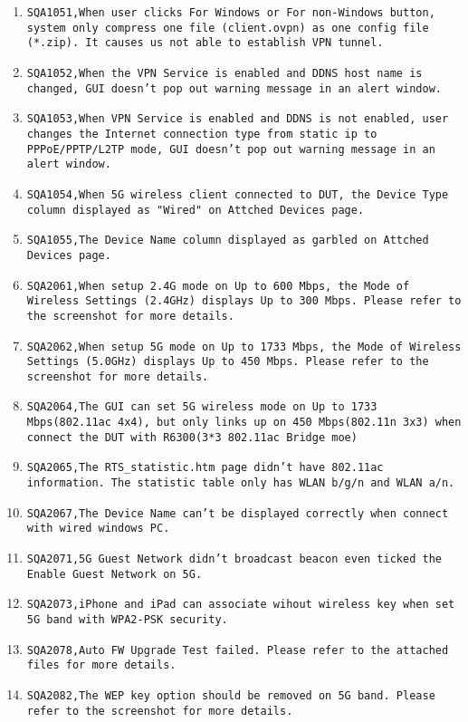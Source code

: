 \documentclass[12pt]{report}
\begin{document}
\begin{itemize}
\begin{enumerate}
		\item \texttt{SQA1051,When user clicks For Windows or For non-Windows button, system only compress one file (client.ovpn) as one config file (*.zip). It causes us not able to establish VPN tunnel.}
		\item \texttt{SQA1052,When the VPN Service is enabled and DDNS host name is changed, GUI doesn't pop out warning message in an alert window.}
		\item \texttt{SQA1053,When VPN Service is enabled and DDNS is not enabled, user changes the Internet connection type from static ip to PPPoE/PPTP/L2TP mode, GUI doesn't pop out warning message in an alert window.}
		\item \texttt{SQA1054,When 5G wireless client connected to DUT, the Device Type column displayed as "Wired" on Attched Devices page.}
		\item \texttt{SQA1055,The Device Name column displayed as garbled on Attched Devices page.}
		\item \texttt{SQA2061,When setup 2.4G mode on Up to 600 Mbps, the Mode of Wireless Settings (2.4GHz) displays Up to 300 Mbps. Please refer to the screenshot for more details.}
		\item \texttt{SQA2062,When setup 5G mode on Up to 1733 Mbps, the Mode of Wireless Settings (5.0GHz) displays Up to 450 Mbps. Please refer to the screenshot for more details.}
		\item \texttt{SQA2064,The GUI can set 5G wireless mode on Up to 1733 Mbps(802.11ac 4x4), but only links up on 450 Mbps(802.11n 3x3) when connect the DUT with R6300(3*3 802.11ac Bridge moe)}
		\item \texttt{SQA2065,The RTS\_statistic.htm page didn't have 802.11ac information. The statistic table only has WLAN b/g/n and WLAN a/n.}
		\item \texttt{SQA2067,The Device Name can't be displayed correctly when connect with wired windows PC. }
		\item \texttt{SQA2071,5G Guest Network didn't broadcast beacon even ticked the Enable Guest Network on 5G.}
		\item \texttt{SQA2073,iPhone and iPad can associate wihout wireless key when set 5G band with WPA2-PSK security.}
		\item \texttt{SQA2078,Auto FW Upgrade Test failed. Please refer to the attached files for more details.}
		\item \texttt{SQA2082,The WEP key option should be removed on 5G band. Please refer to the screenshot for more details.}

\end{enumerate}
\end{itemize}
\end{document}
